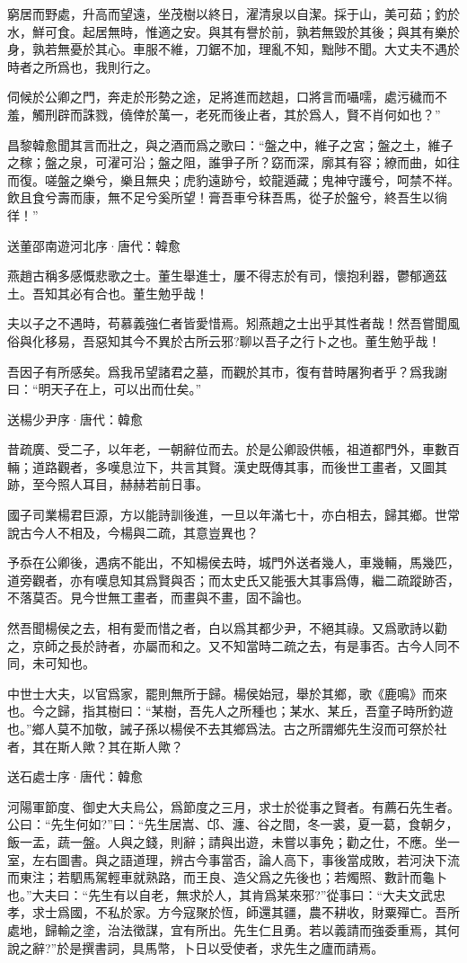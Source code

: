 \documentclass[12pt,a4paper]{ctexbook}
\begin{document}
窮居而野處，升高而望遠，坐茂樹以終日，濯清泉以自潔。採于山，美可茹；釣於水，鮮可食。起居無時，惟適之安。與其有譽於前，孰若無毀於其後；與其有樂於身，孰若無憂於其心。車服不維，刀鋸不加，理亂不知，黜陟不聞。大丈夫不遇於時者之所爲也，我則行之。\par
伺候於公卿之門，奔走於形勢之途，足將進而趑趄，口將言而囁嚅，處污穢而不羞，觸刑辟而誅戮，僥倖於萬一，老死而後止者，其於爲人，賢不肖何如也？”\par
昌黎韓愈聞其言而壯之，與之酒而爲之歌曰：“盤之中，維子之宮；盤之土，維子之稼；盤之泉，可濯可沿；盤之阻，誰爭子所？窈而深，廓其有容；繚而曲，如往而復。嗟盤之樂兮，樂且無央；虎豹遠跡兮，蛟龍遁藏；鬼神守護兮，呵禁不祥。飲且食兮壽而康，無不足兮奚所望！膏吾車兮秣吾馬，從子於盤兮，終吾生以徜徉！”\par
送董邵南遊河北序·唐代：韓愈 \par
燕趙古稱多感慨悲歌之士。董生舉進士，屢不得志於有司，懷抱利器，鬱郁適茲土。吾知其必有合也。董生勉乎哉！\par
夫以子之不遇時，苟慕義強仁者皆愛惜焉。矧燕趙之士出乎其性者哉！然吾嘗聞風俗與化移易，吾惡知其今不異於古所云邪?聊以吾子之行卜之也。董生勉乎哉！\par
吾因子有所感矣。爲我吊望諸君之墓，而觀於其市，復有昔時屠狗者乎？爲我謝曰：“明天子在上，可以出而仕矣。”\par
送楊少尹序·唐代：韓愈 \par
昔疏廣、受二子，以年老，一朝辭位而去。於是公卿設供帳，祖道都門外，車數百輛；道路觀者，多嘆息泣下，共言其賢。漢史既傳其事，而後世工畫者，又圖其跡，至今照人耳目，赫赫若前日事。\par
國子司業楊君巨源，方以能詩訓後進，一旦以年滿七十，亦白相去，歸其鄉。世常說古今人不相及，今楊與二疏，其意豈異也？\par
予忝在公卿後，遇病不能出，不知楊侯去時，城門外送者幾人，車幾輛，馬幾匹，道旁觀者，亦有嘆息知其爲賢與否；而太史氏又能張大其事爲傳，繼二疏蹤跡否，不落莫否。見今世無工畫者，而畫與不畫，固不論也。\par
然吾聞楊侯之去，相有愛而惜之者，白以爲其都少尹，不絕其祿。又爲歌詩以勸之，京師之長於詩者，亦屬而和之。又不知當時二疏之去，有是事否。古今人同不同，未可知也。\par
中世士大夫，以官爲家，罷則無所于歸。楊侯始冠，舉於其鄉，歌《鹿鳴》而來也。今之歸，指其樹曰：“某樹，吾先人之所種也；某水、某丘，吾童子時所釣遊也。”鄉人莫不加敬，誡子孫以楊侯不去其鄉爲法。古之所謂鄉先生沒而可祭於社者，其在斯人歟？其在斯人歟？\par
送石處士序·唐代：韓愈 \par
河陽軍節度、御史大夫烏公，爲節度之三月，求士於從事之賢者。有薦石先生者。公曰：“先生何如?”曰：“先生居嵩、邙、瀍、谷之間，冬一裘，夏一葛，食朝夕，飯一盂，蔬一盤。人與之錢，則辭；請與出遊，未嘗以事免；勸之仕，不應。坐一室，左右圖書。與之語道理，辨古今事當否，論人高下，事後當成敗，若河決下流而東注；若駟馬駕輕車就熟路，而王良、造父爲之先後也；若燭照、數計而龜卜也。”大夫曰：“先生有以自老，無求於人，其肯爲某來邪?”從事曰：“大夫文武忠孝，求士爲國，不私於家。方今寇聚於恆，師還其疆，農不耕收，財粟殫亡。吾所處地，歸輸之塗，治法徵謀，宜有所出。先生仁且勇。若以義請而強委重焉，其何說之辭?”於是撰書詞，具馬幣，卜日以受使者，求先生之廬而請焉。\par
\end{document}
